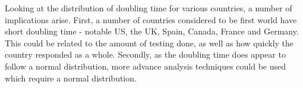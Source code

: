 Looking at the distribution of doubling time for various countries, a number of implications arise.
First, a number of countries considered to be first world have short doubling time - notable US, the UK, Spain, Canada, France and Germany.
This could be related to the amount of testing done, as well as how quickly the country responded as a whole.
Secondly, as the doubling time does appear to follow a normal distribution, more advance analysis techniques could be used which require a normal distribution.
